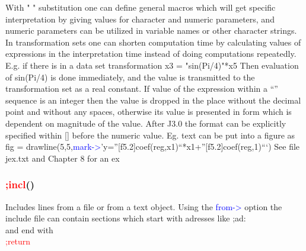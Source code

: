 With " " substitution one can define general macros which will get specific interpretation by
giving values for character and numeric parameters, and numeric parameters can be utilized in
variable names or other character strings. In transformation sets one can shorten computation
time by calculating values of expressions in the interpretation time instead of doing
computations repeatedly. E.g. if there is in a data set transformation
x3 = "\textcolor{VioletRed}{sin}(Pi/4)"*x5
Then evaluation of \textcolor{VioletRed}{sin}(Pi/4) is done immediately, and the value is transmitted to the
transformation set as a real constant.
If value of the expression within a “” sequence is an integer then the value is dropped in the
place without the decimal point and without any spaces, otherwise its value is presented in
form which is dependent on magnitude of the value. After J3.0 the format can be explicitly
specified within [] before the numeric value. Eg. text can be put into a figure as
fig =
\textcolor{VioletRed}{drawline}(5,5,\textcolor{blue}{mark->}’y=”[f5.2]coef(reg,x1)“*x1+”[f5.2]coef(reg,1)“‘)
See file jex.txt and Chapter 8 for an ex
\subsubsection{\textcolor{Red}{;incl}()}
\label{incl}
Includes lines from a file or from a text object. Using the \textcolor{blue}{from->}
option the include file can contain sections which start with adresses like
;ad: \\
and end with \\
\textcolor{Red}{;return}

